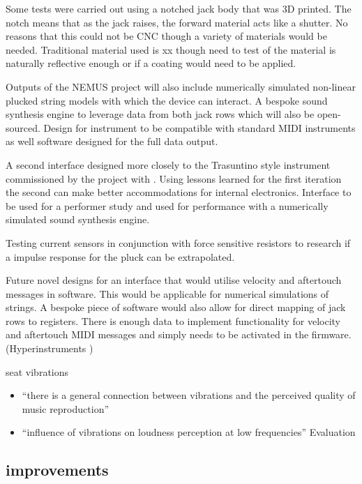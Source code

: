 Some tests were carried out using a notched jack body that was 3D
printed. The notch means that as the jack raises, the forward material
acts like a shutter. No reasons that this could not be CNC though a
variety of materials would be needed. Traditional material used is xx
though need to test of the material is naturally reflective enough or if
a coating would need to be applied.

Outputs of the NEMUS project will also include numerically simulated
non-linear plucked string models with which the device can interact. A
bespoke sound synthesis engine to leverage data from both jack rows
which will also be open-sourced. Design for instrument to be compatible
with standard MIDI instruments as well software designed for the full
data output.

A second interface designed more closely to the Trasuntino style
instrument commissioned by the  project with . Using
lessons learned for the first iteration the second can make better
accommodations for internal electronics. Interface to be used for a
performer study and used for performance with a numerically simulated
sound synthesis engine.

Testing current sensors in conjunction with force sensitive resistors to
research if a impulse response for the pluck can be extrapolated.

Future novel designs for an interface that would utilise velocity and
aftertouch messages in software. This would be applicable for numerical
simulations of strings. A bespoke piece of software would also allow
for direct mapping of jack rows to registers. There is enough data to
implement functionality for velocity and aftertouch MIDI messages and
simply needs to be activated in the firmware. (Hyperinstruments
\cite{nime2024_20})

seat vibrations \cite{MusicalHaptics2018_07}

\begin{itemize}
\item
  ``there is a general connection between vibrations and the perceived
  quality of music reproduction''
\item
  ``influence of vibrations on loudness perception at low frequencies''
  Evaluation
\end{itemize}

\subsection{improvements}\label{improvements}


